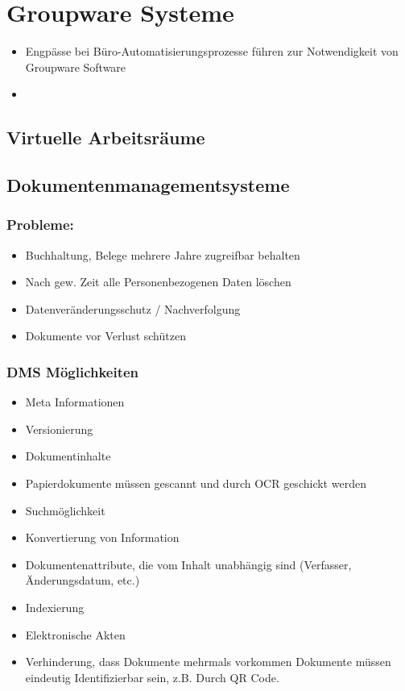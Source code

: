 \documentclass[ngerman,a4paper,12pt]{scrreprt}
\begin{document}
\section{Groupware Systeme}
\begin{itemize}
	\item Engpässe bei Büro-Automatisierungsprozesse führen zur Notwendigkeit von Groupware Software
	\item 
\end{itemize}

\subsection{Virtuelle Arbeitsräume}

\subsection{Dokumentenmanagementsysteme}
\subsubsection{Probleme:}
\begin{itemize}
	\item Buchhaltung, Belege mehrere Jahre zugreifbar behalten
	\item Nach gew. Zeit alle Personenbezogenen Daten löschen
	\item Datenveränderungsschutz / Nachverfolgung
	\item Dokumente vor Verlust schützen
\end{itemize}

\subsubsection{DMS Möglichkeiten}
\begin{itemize}
	\item Meta Informationen
	\item Versionierung
	\item Dokumentinhalte
	\item Papierdokumente müssen gescannt und durch OCR geschickt werden
	\item Suchmöglichkeit
	\item Konvertierung von Information
	\item Dokumentenattribute, die vom Inhalt unabhängig sind (Verfasser, Änderungsdatum, etc.)
	\item Indexierung
	\item Elektronische Akten
	\item Verhinderung, dass Dokumente mehrmals vorkommen \ra Dokumente müssen eindeutig Identifizierbar sein, z.B. Durch QR Code.
\end{itemize}
\end{document}
